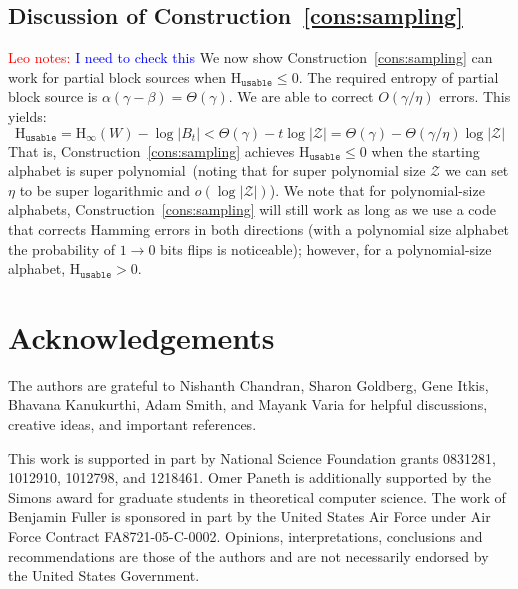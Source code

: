 \documentclass[11pt]{article}
\newcommand{\thref}[1]{\mbox{Theorem~\ref{#1}}}
\newcommand{\consref}[1]{\mbox{Construction~\ref{#1}}}
\newcommand{\class}[1]{{\ensuremath{\mathsf{#1}}}}
\newcommand{\gen}{\ensuremath{\class{Gen}}\xspace}
\newcommand{\rep}{\ensuremath{\class{Rep}}\xspace}
\newcommand{\dis}{\ensuremath{\mathsf{dis}}}
\newcommand{\ngl}{\ensuremath{\mathtt{ngl}}\xspace}
\newcommand{\Hoo}{\mathrm{H}_\infty}
\newcommand{\Huse}{\mathrm{H}_{\mathtt{usable}}}
\newtheorem{corollary}[theorem]{Corollary}
\newcommand{\authnote}[2]{{\textcolor{red}{\textsf{#1 notes: }\textcolor{blue}{ #2}}\marginpar{\textcolor{red}{\textbf{!!!!!}}}}}
\newcommand{\authnote}[2]{}
\newcommand{\lnote}[1]{{\authnote{Leo}{#1}}}
\begin{document}

\subsection{Discussion of \consref{cons:sampling}}
\lnote{I need to check this}
We now show \consref{cons:sampling} can work for partial block sources when $\Huse\le 0$.  The required entropy of partial block source is $\alpha (\gamma-\beta ) = \Theta(\gamma)$.  We are able to correct $O(\gamma/\eta)$ errors.
This yields:
\[
\Huse = \Hoo(W) -\log |B_t| < \Theta(\gamma)- t \log |\mathcal{Z}|= \Theta(\gamma) - \Theta(\gamma/\eta) \log |\mathcal{Z}|
\]
That is, \consref{cons:sampling} achieves $\Huse\le 0$ when the starting alphabet is super polynomial~(noting that for super polynomial size $\mathcal{Z}$ we can set $\eta$ to be super logarithmic and $o(\log |\mathcal{Z}|)$).  We note that for polynomial-size alphabets, \consref{cons:sampling} will still work as long as we use a code that corrects Hamming errors in both directions (with a polynomial size alphabet the probability of $1\rightarrow 0$ bits flips is noticeable); however, for a polynomial-size alphabet, $\Huse>0$.

\section*{Acknowledgements}
The authors are grateful to Nishanth Chandran, Sharon Goldberg, Gene Itkis, Bhavana Kanukurthi, Adam Smith, and Mayank Varia for helpful discussions, creative ideas, and important references.

This work is supported in part by National Science Foundation grants 0831281, 1012910, 1012798, and 1218461. 
Omer Paneth is additionally supported by the Simons award for graduate students in theoretical computer science.
The work of Benjamin Fuller is sponsored in part by the United States Air Force under Air Force Contract FA8721-05-C-0002. Opinions, interpretations, conclusions and recommendations are those of the authors and are not necessarily endorsed by the United States Government.


\end{document}
